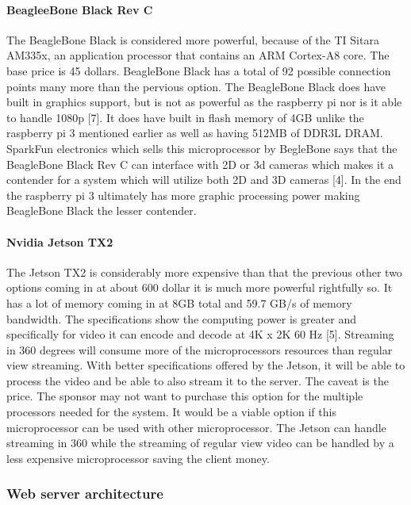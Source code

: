 \documentclass[onecolumn, draftclsnofoot,10pt, compsoc]{IEEEtran}
\begin{document}
            \paragraph{BeagleeBone Black Rev C}
            The BeagleBone Black is considered more powerful, because of the TI Sitara AM335x, an application processor that contains an ARM Cortex-A8 core. The base price is 45 dollars.  BeagleBone Black has a total of 92 possible connection points many more than the pervious option. The BeagleBone Black does have built in graphics support, but is not as powerful as the raspberry pi nor is it able to handle 1080p [7]. It does have built in flash memory of 4GB unlike the raspberry pi 3 mentioned earlier as well as having 512MB of DDR3L DRAM. SparkFun electronics which sells this microprocessor by BegleBone says that the BeagleBone Black Rev C can interface with 2D or 3d cameras which makes it a contender for a system which will utilize both 2D and 3D cameras [4]. In the end the raspberry pi 3 ultimately has more graphic processing power making BeagleBone Black the lesser contender.  
            
            \paragraph{ Nvidia Jetson TX2}
            The Jetson TX2 is considerably more expensive than that the previous other two options coming in at about 600 dollar it is much more powerful rightfully so. It has a lot of memory coming in at 8GB total and 59.7 GB/s of memory bandwidth. The specifications show the computing power is greater and specifically for video it can encode and decode at 4K x 2K 60 Hz [5]. Streaming in 360 degrees will consume more of the microprocessors resources than regular view streaming. With better specifications offered by the Jetson, it will be able to process the video and be able to also stream it to the server. The caveat is the price. The sponsor may not want to purchase this option for the multiple processors needed for the system. It would be a viable option if this microprocessor can be used with other microprocessor. The Jetson can handle streaming in 360 while the streaming of regular view video can be handled by a less expensive microprocessor saving the client money. 
    
        \subsubsection{Web server architecture}
\end{document}
